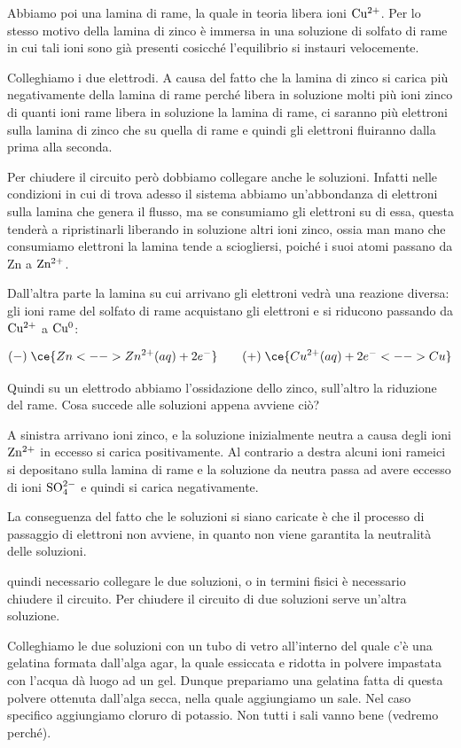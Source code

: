 Abbiamo poi una lamina di rame, la quale in teoria libera ioni $\rm Cu^{2+}$. Per lo stesso motivo della lamina di zinco è immersa in una soluzione di solfato di rame in cui tali ioni sono già presenti cosicché l'equilibrio si instauri velocemente.

Colleghiamo i due elettrodi. A causa del fatto che la lamina di zinco si carica più negativamente della lamina di rame perché libera in soluzione molti più ioni zinco di quanti ioni rame libera in soluzione la lamina di rame, ci saranno più elettroni sulla lamina di zinco che su quella di rame e quindi gli elettroni fluiranno dalla prima alla seconda.

Per chiudere il circuito però dobbiamo collegare anche le soluzioni. Infatti nelle condizioni in cui di trova adesso
il sistema abbiamo un'abbondanza di elettroni sulla lamina che genera il flusso, ma se consumiamo gli elettroni su di essa, questa tenderà a ripristinarli liberando in soluzione altri ioni zinco, ossia man mano che consumiamo elettroni la lamina tende a sciogliersi, poiché i suoi atomi passano da Zn a $\rm Zn^{2+}$.

Dall'altra parte la lamina su cui arrivano gli elettroni vedrà una reazione diversa: gli ioni rame del solfato di rame acquistano gli elettroni e si riducono passando da $\rm Cu^{2+}$ a $\rm Cu^0$:

$$(-) \; \ce{Zn <--> Zn^{2+}(aq) + 2e^-} \qquad (+) \; \ce{ Cu^{2+}(aq) + 2e^- <--> Cu}$$

Quindi su un elettrodo abbiamo l'ossidazione dello zinco, sull'altro la riduzione del rame. Cosa succede alle soluzioni appena avviene ciò?

A sinistra arrivano ioni zinco, e la soluzione inizialmente neutra a causa degli ioni $\rm Zn^{2+}$ in eccesso si carica positivamente. Al contrario a destra alcuni ioni rameici si depositano sulla lamina di rame e la soluzione da neutra passa ad avere eccesso di ioni $\rm SO_4^{2-}$ e quindi si carica negativamente.

La conseguenza del fatto che le soluzioni si siano caricate è che il processo di passaggio di elettroni non avviene, in quanto non viene garantita la neutralità delle soluzioni.

\E quindi necessario collegare le due soluzioni, o in termini fisici è necessario chiudere il circuito. Per chiudere il circuito di due soluzioni serve un'altra soluzione.

Colleghiamo le due soluzioni con un tubo di vetro all'interno del quale c'è una gelatina formata dall'alga agar, la quale essiccata e ridotta in polvere impastata con l'acqua dà luogo ad un gel. Dunque prepariamo una gelatina fatta di questa polvere ottenuta dall'alga secca, nella quale aggiungiamo un sale. Nel caso specifico aggiungiamo cloruro di potassio. Non tutti i sali vanno bene (vedremo perché).

